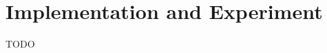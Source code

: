 \documentclass[sigconf]{acmart}
\newcommand*{\highlight}[1]{\textbf{\textit{#1}}}
\begin{document}
\section{Implementation and Experiment} \label{sec:imp}
TODO
\end{document}
